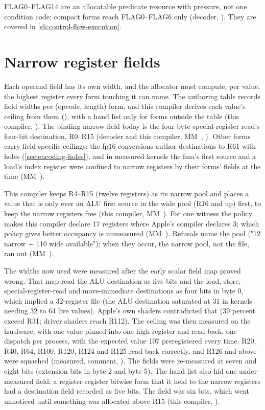 FLAG0–FLAG14 are an allocatable predicate resource with pressure, not one condition code; compact forms
reach FLAG0–FLAG6 only (decoder, ). They are covered in \cref{ch:control-flow-execution}.

\section{Narrow register fields}\label{sec:narrow-fields-narrow}

Each operand field has its own width, and the allocator must compute, per value, the highest register
every form touching it can name. The authoring table records field widths per (opcode, length) form, and this
compiler derives each value's ceiling from them (), with a hand list only for forms outside the table
(this compiler,  ). The binding narrow field today is the four-byte special-register
read's four-bit destination, R0–R15 (decoder and this compiler, MM~, ). Other forms carry
field-specific ceilings: the fp16 conversions author destinations to R61 with holes (\cref{sec:encoding-holes}), and in measured
kernels the fma's first source and a load's index register were confined to narrow registers by their forms' fields at
the time (MM~).

This compiler keeps R4–R15 (twelve registers) as its narrow pool and places a value that is only
ever an ALU first source in the wide pool (R16 and up) first, to keep the narrow registers free (this compiler,
MM~). For one witness the policy makes this compiler declare 17 registers where Apple's compiler
declares 3; which policy gives better occupancy is unmeasured (MM~). Refusals name the pool ("12 narrow + 110
wide available"); when they occur, the narrow pool, not the file, ran out (MM~).

The widths now used were measured after the early scalar field map proved wrong. That map read the ALU
destination as five bits and the load, store, special-register-read and move-immediate destinations as four bits in
byte 0, which implied a 32-register file (the ALU destination saturated at 31 in kernels needing 32 to 64 live values).
Apple's own shaders contradicted that (39 percent exceed R31; driver shaders reach R112). The ceiling was then measured on
the hardware, with one value pinned into one high register and read back, one dispatch per process, with the expected value 107
preregistered every time. R20, R40, R64, R100, R120, R124 and R125 read back correctly, and R126 and above were squashed (measured,  comment,
). The fields were re-measured at seven and eight bits (extension bits in byte 2 and byte 5).
The hand list also hid one under-measured field: a register-register bitwise form that it held to the narrow
registers had a destination field recorded as five bits. The field was six bits, which went unnoticed until something
was allocated above R15 (this compiler, ).

